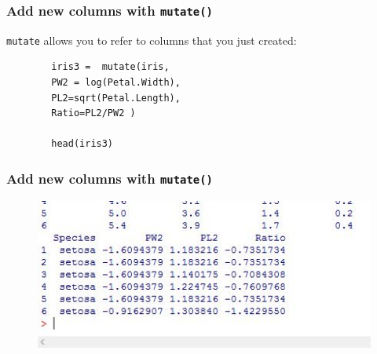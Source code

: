 \documentclass{beamer}
\begin{document}
	\begin{frame}[fragile]
		
		\frametitle{Add new columns with \texttt{mutate()} }
		\texttt{mutate} allows you to refer to columns that you just created:
		
		\begin{verbatim}
		iris3 =  mutate(iris, 
		PW2 = log(Petal.Width), 
		PL2=sqrt(Petal.Length), 
		Ratio=PL2/PW2 )
		
		head(iris3)
		\end{verbatim}
	\end{frame} 
	\begin{frame}
		
		\frametitle{Add new columns with \texttt{mutate()} }
		\begin{figure}
			\centering
			\includegraphics[width=0.9\linewidth]{images/irismutate2}
			
		\end{figure}
		
	\end{frame}
	
\end{document}
